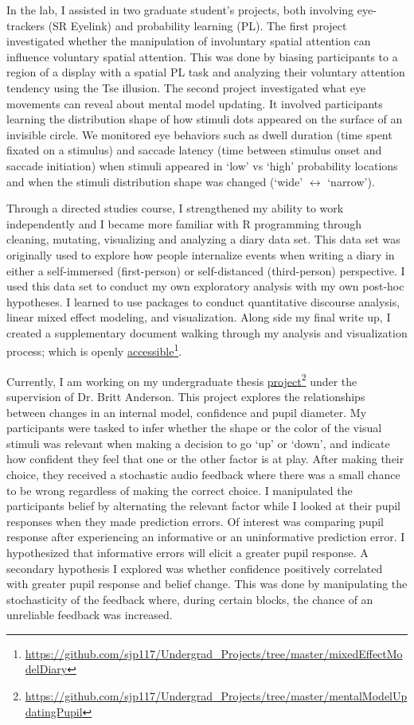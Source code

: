 \documentclass[12pt]{article}
\begin{document}
	In the lab, I assisted in two graduate student's projects, both involving eye-trackers (SR Eyelink) and probability learning (PL). The first project investigated whether the manipulation of involuntary spatial attention can influence voluntary spatial attention. This was done by biasing participants to a region of a display with a spatial PL task and analyzing their voluntary attention tendency using the Tse illusion. The second project investigated what eye movements can reveal about mental model updating. It involved participants learning the distribution shape of how stimuli dots appeared on the surface of an invisible circle. We monitored eye behaviors such as dwell duration (time spent fixated on a stimulus) and saccade latency (time between stimulus onset and saccade initiation) when stimuli appeared in `low' vs `high' probability locations and when the stimuli distribution shape was changed (`wide' $\leftrightarrow$ `narrow').
	
	Through a directed studies course, I strengthened my ability to work independently and I became more familiar with R programming through cleaning, mutating, visualizing and analyzing a diary data set. This data set was originally used to explore how people internalize events when writing a diary in either a self-immersed (first-person) or self-distanced (third-person) perspective. I used this data set to conduct my own exploratory analysis with my own post-hoc hypotheses. I learned to use packages to conduct quantitative discourse analysis, linear mixed effect modeling, and visualization. Along side my final write up, I created a supplementary document walking through my analysis and visualization process; which is openly  \href{https://github.com/sjp117/Undergrad_Projects/tree/master/mixedEffectModelDiary}{accessible}\footnote{\url{https://github.com/sjp117/Undergrad\_Projects/tree/master/mixedEffectModelDiary}}.
	
	Currently, I am working on my undergraduate thesis \href{https://github.com/sjp117/Undergrad_Projects/tree/master/mentalModelUpdatingPupil}{project}\footnote{\url{https://github.com/sjp117/Undergrad\_Projects/tree/master/mentalModelUpdatingPupil}} under the supervision of Dr. Britt Anderson. This project explores the relationships between changes in an internal model, confidence and pupil diameter. My participants were tasked to infer whether the shape or the color of the visual stimuli was relevant when making a decision to go `up' or `down', and indicate how confident they feel that one or the other factor is at play. After making their choice, they received a stochastic audio feedback where there was a small chance to be wrong regardless of making the correct choice. I manipulated the participants belief by alternating the relevant factor while I looked at their pupil responses when they made prediction errors. Of interest was comparing pupil response after experiencing an informative or an uninformative prediction error. I hypothesized that informative errors will elicit a greater pupil response. A secondary hypothesis I explored was whether confidence positively correlated with greater pupil response and belief change. This was done by manipulating the stochasticity of the feedback where, during certain blocks, the chance of an unreliable feedback was increased.
	
\end{document}
